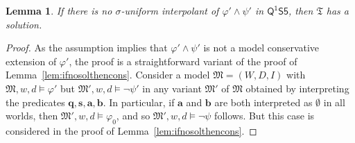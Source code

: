 \documentclass[10pt,a4paper]{amsart}
\theoremstyle{plain}
\newtheorem{lem}[thm]{Lemma}
\theoremstyle{definition}
\newcommand{\tiling}{\mathfrak T}
\newcommand{\ssvar}{\fform{s}}
\newcommand{\FOMS}{\ensuremath{\mathsf{Q^1S5}}}
\newcommand{\fform}[1]{\boldsymbol{#1}}
\newcommand{\qvar}{\fform{q}}
\newcommand{\avar}{\fform{a}}
\newcommand{\bvar}{\fform{b}}
\begin{document}
		\begin{lem}
			If there is no $\sigma$-uniform interpolant of $\varphi'\land\psi'$ in $\FOMS$, then $\tiling$ has a solution.
		\end{lem}
		\begin{proof}
			As the assumption implies that $\varphi'\land\psi'$ is not a model conservative extension of $\varphi'$,
			the proof is a straightforward variant of the proof of Lemma~\ref{lem:ifnosolthencons}.
			Consider a model $\mathfrak{M}=(W,D,I)$ with $\mathfrak{M},w,d\models \varphi'$ but 
			$\mathfrak{M}',w,d\models \neg\psi'$
			in any variant $\mathfrak M'$ of $\mathfrak{M}$ obtained by interpreting the predicates $\qvar,\ssvar,\avar,\bvar$. In particular, if $\avar$ and $\bvar$ are both interpreted as $\emptyset$ in all worlds, then 
			$\mathfrak{M}',w,d\models \varphi_0$, and so  
			$\mathfrak{M}',w,d\models \neg\psi$ follows.	 
			But this case is considered in the proof of Lemma~\ref{lem:ifnosolthencons}. 
		\end{proof}
		
\end{document}
